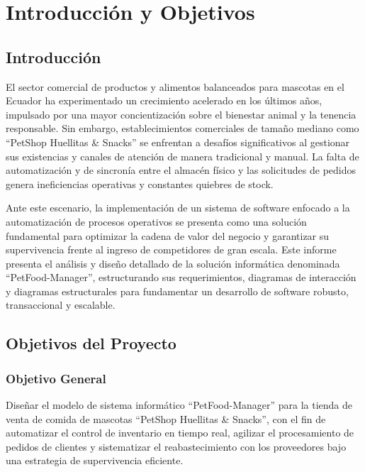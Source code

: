 \section{Introducción y Objetivos}

\subsection{Introducción}
El sector comercial de productos y alimentos balanceados para mascotas en el Ecuador ha experimentado un crecimiento acelerado en los últimos años, impulsado por una mayor concientización sobre el bienestar animal y la tenencia responsable. Sin embargo, establecimientos comerciales de tamaño mediano como ``PetShop Huellitas \& Snacks'' se enfrentan a desafíos significativos al gestionar sus existencias y canales de atención de manera tradicional y manual. La falta de automatización y de sincronía entre el almacén físico y las solicitudes de pedidos genera ineficiencias operativas y constantes quiebres de stock. 

Ante este escenario, la implementación de un sistema de software enfocado a la automatización de procesos operativos se presenta como una solución fundamental para optimizar la cadena de valor del negocio y garantizar su supervivencia frente al ingreso de competidores de gran escala. Este informe presenta el análisis y diseño detallado de la solución informática denominada ``PetFood-Manager'', estructurando sus requerimientos, diagramas de interacción y diagramas estructurales para fundamentar un desarrollo de software robusto, transaccional y escalable.

\subsection{Objetivos del Proyecto}

\subsubsection{Objetivo General}
Diseñar el modelo de sistema informático ``PetFood-Manager'' para la tienda de venta de comida de mascotas ``PetShop Huellitas \& Snacks'', con el fin de automatizar el control de inventario en tiempo real, agilizar el procesamiento de pedidos de clientes y sistematizar el reabastecimiento con los proveedores bajo una estrategia de supervivencia eficiente.

